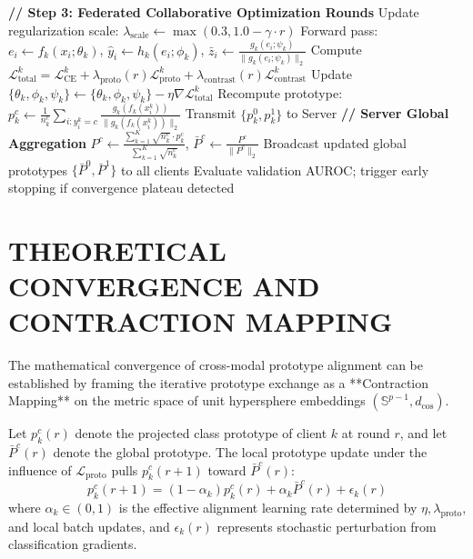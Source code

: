 \documentclass[12pt,a4paper]{amritareport}
\begin{document}
\begin{algorithm}[htbp]
\begin{algorithmic}[1]
\STATE \textbf{// Step 3: Federated Collaborative Optimization Rounds}
        \STATE Update regularization scale: $\lambda_{\text{scale}} \leftarrow \max(0.3, 1.0 - \gamma \cdot r)$
                \STATE Forward pass: $e_i \leftarrow f_k(x_i; \theta_k)$, $\hat{y}_i \leftarrow h_k(e_i; \phi_k)$, $\bar{z}_i \leftarrow \frac{g_k(e_i; \psi_k)}{\|g_k(e_i; \psi_k)\|_2}$
                \STATE Compute $\mathcal{L}_{\text{total}}^k = \mathcal{L}_{\text{CE}}^k + \lambda_{\text{proto}}(r) \mathcal{L}_{\text{proto}}^k + \lambda_{\text{contrast}}(r) \mathcal{L}_{\text{contrast}}^k$
                \STATE Update $\{\theta_k, \phi_k, \psi_k\} \leftarrow \{\theta_k, \phi_k, \psi_k\} - \eta \nabla \mathcal{L}_{\text{total}}^k$
            \ENDFOR
        \ENDFOR
            \STATE Recompute prototype: $p_k^c \leftarrow \frac{1}{n_k^c} \sum_{i: y_i^k = c} \frac{g_k(f_k(x_i^k))}{\|g_k(f_k(x_i^k))\|_2}$
        \ENDFOR
        \STATE Transmit $\{p_k^0, p_k^1\}$ to Server
    \ENDFOR
    \STATE \textbf{// Server Global Aggregation}
        \STATE $P^c \leftarrow \frac{\sum_{k=1}^K \sqrt{n_k^c} \cdot p_k^c}{\sum_{k=1}^K \sqrt{n_k^c}}$, \quad $\bar{P}^c \leftarrow \frac{P^c}{\|P^c\|_2}$
    \ENDFOR
    \STATE Broadcast updated global prototypes $\{\bar{P}^0, \bar{P}^1\}$ to all clients
    \STATE Evaluate validation AUROC; trigger early stopping if convergence plateau detected
\ENDFOR
\end{algorithmic}
\end{algorithm}


\section{THEORETICAL CONVERGENCE AND CONTRACTION MAPPING}

The mathematical convergence of cross-modal prototype alignment can be established by framing the iterative prototype exchange as a **Contraction Mapping** on the metric space of unit hypersphere embeddings $(\mathbb{S}^{p-1}, d_{\cos})$.

Let $p_k^c(r)$ denote the projected class prototype of client $k$ at round $r$, and let $\bar{P}^c(r)$ denote the global prototype. The local prototype update under the influence of $\mathcal{L}_{\text{proto}}$ pulls $p_k^c(r+1)$ toward $\bar{P}^c(r)$:
\begin{equation}
	p_k^c(r+1) = (1 - \alpha_k) p_k^c(r) + \alpha_k \bar{P}^c(r) + \epsilon_k(r)
\end{equation}
where $\alpha_k \in (0, 1)$ is the effective alignment learning rate determined by $\eta, \lambda_{\text{proto}}$, and local batch updates, and $\epsilon_k(r)$ represents stochastic perturbation from classification gradients.
\end{document}
